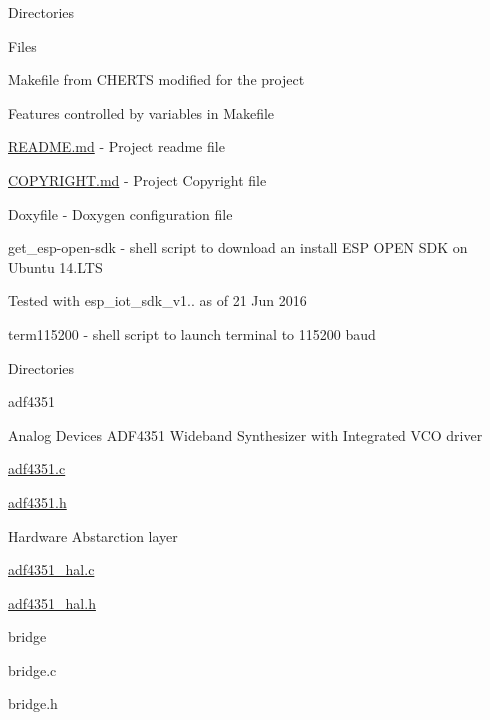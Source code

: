 \begin{DoxyParagraph}{Directories}

\begin{DoxyItemize}
\item Files
\begin{DoxyItemize}
\item Makefile from C\+H\+E\+R\+TS modified for the project
\begin{DoxyItemize}
\item Features controlled by variables in Makefile
\end{DoxyItemize}
\item \hyperlink{README_8md}{R\+E\+A\+D\+M\+E.\+md} -\/ Project readme file
\item \hyperlink{COPYRIGHT_8md}{C\+O\+P\+Y\+R\+I\+G\+H\+T.\+md} -\/ Project Copyright file
\item Doxyfile -\/ Doxygen configuration file
\item get\+\_\+esp-\/open-\/sdk -\/ shell script to download an install E\+SP O\+P\+EN S\+DK on Ubuntu 14.\+L\+TS
\begin{DoxyItemize}
\item Tested with esp\+\_\+iot\+\_\+sdk\+\_\+v1.. as of 21 Jun 2016
\end{DoxyItemize}
\item term115200 -\/ shell script to launch terminal to 115200 baud
\end{DoxyItemize}
\item Directories
\item adf4351
\begin{DoxyItemize}
\item Analog Devices A\+D\+F4351 Wideband Synthesizer with Integrated V\+CO driver
\begin{DoxyItemize}
\item \hyperlink{adf4351_8c}{adf4351.\+c}
\item \hyperlink{adf4351_8h}{adf4351.\+h}
\end{DoxyItemize}
\item Hardware Abstarction layer
\item \hyperlink{adf4351__hal_8c}{adf4351\+\_\+hal.\+c}
\item \hyperlink{adf4351__hal_8h}{adf4351\+\_\+hal.\+h}
\end{DoxyItemize}
\item bridge
\begin{DoxyItemize}
\item bridge.\+c
\item bridge.\+h

\end{DoxyItemize}
\end{DoxyItemize}
\end{DoxyParagraph}
